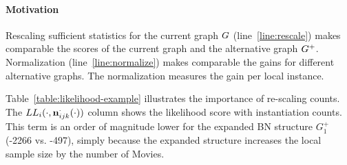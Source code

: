 \documentclass{article}
\begin{document}
\paragraph{Motivation}  Rescaling sufficient statistics for the current graph $G$ (line~\ref{line:rescale}) makes comparable the scores of the current graph and the alternative graph $G^{+}$.  Normalization (line~\ref{line:normalize}) makes comparable the gains for different alternative graphs.
The normalization measures the gain per local instance.


%
Table~\ref{table:likelihood-example} illustrates the importance of re-scaling counts. The $LL_{i}(\cdot,\boldsymbol{\mathrm{n}}^{\cdot}_{ijk}(\cdot))$ column shows the likelihood score with instantiation counts. This term is an order of magnitude lower for the expanded BN structure $G_{1}^+$ (-2266 vs. -497),  simply because the expanded structure increases the local sample size by the number of Movies. 

\end{document}
